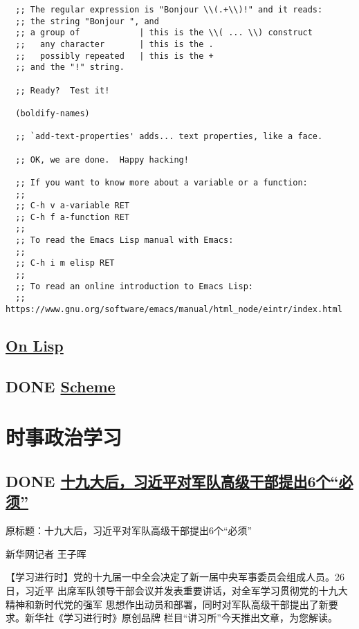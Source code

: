 \documentclass[11pt]{ctexart}
\begin{document}
{{{{\begin{lstlisting}
  ;; The regular expression is "Bonjour \\(.+\\)!" and it reads:
  ;; the string "Bonjour ", and
  ;; a group of            | this is the \\( ... \\) construct
  ;;   any character       | this is the .
  ;;   possibly repeated   | this is the +
  ;; and the "!" string.

  ;; Ready?  Test it!

  (boldify-names)

  ;; `add-text-properties' adds... text properties, like a face.

  ;; OK, we are done.  Happy hacking!

  ;; If you want to know more about a variable or a function:
  ;;
  ;; C-h v a-variable RET
  ;; C-h f a-function RET
  ;;
  ;; To read the Emacs Lisp manual with Emacs:
  ;;
  ;; C-h i m elisp RET
  ;;
  ;; To read an online introduction to Emacs Lisp:
  ;; https://www.gnu.org/software/emacs/manual/html_node/eintr/index.html
\end{lstlisting}


\subsection{\href{http://www.ituring.com.cn/book/miniarticle/53201}{On Lisp}}
\label{sec:org981e042}
\subsection{{\bfseries\sffamily DONE} \href{http://deathking.github.io/yast-cn/}{Scheme}}
\label{sec:orgb45acb0}

\section{时事政治学习}
\label{sec:org53d963c}

\subsection{{\bfseries\sffamily DONE} \href{http://news.ifeng.com/a/20171029/52843046\_0.shtml}{十九大后，习近平对军队高级干部提出6个“必须”}}
\label{sec:org3204cc9}
原标题：十九大后，习近平对军队高级干部提出6个“必须”

新华网记者 王子晖

【学习进行时】党的十九届一中全会决定了新一届中央军事委员会组成人员。26日，习近平
出席军队领导干部会议并发表重要讲话，对全军学习贯彻党的十九大精神和新时代党的强军
思想作出动员和部署，同时对军队高级干部提出了新要求。新华社《学习进行时》原创品牌
栏目“讲习所”今天推出文章，为您解读。

}}}}
\end{document}

